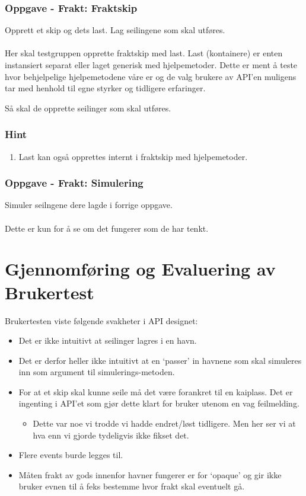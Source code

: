 \documentclass[12pt]{article}
\begin{document}
\newpage
\subsubsection{Oppgave - Frakt: Fraktskip}

Opprett et skip og dets last. Lag seilingene som skal utføres. \\ \\
Her skal testgruppen opprette fraktskip med last. Last (kontainere) er enten instansiert separat eller 
laget generisk med hjelpemetoder. Dette er ment å teste hvor behjelpelige hjelpemetodene våre er og 
de valg brukere av API'en muligens tar med henhold til egne styrker og tidligere erfaringer.

Så skal de opprette seilinger som skal utføres. 

\subsubsection*{Hint}

\begin{enumerate}
    \item Last kan også opprettes internt i fraktskip med hjelpemetoder.
\end{enumerate}

\subsubsection{Oppgave - Frakt: Simulering}

Simuler seilngene dere lagde i forrige oppgave. \\ \\
Dette er kun for å se om det fungerer som de har tenkt.

\section{Gjennomføring og Evaluering av Brukertest}

Brukertesten viste følgende svakheter i API designet:
\begin{itemize}
    \item Det er ikke intuitivt at seilinger lagres i en havn.
    \item Det er derfor heller ikke intuitivt at en `passer' in havnene som skal simuleres inn som argument til simulerings-metoden.
    \item For at et skip skal kunne seile må det være forankret til en kaiplass. Det er ingenting i API'et som gjør dette klart for bruker utenom en vag feilmelding.
    \begin{itemize}
        \item Dette var noe vi trodde vi hadde endret/løst tidligere. Men her ser vi at hva enn vi gjorde tydeligvis ikke fikset det.
    \end{itemize}
    \item Flere events burde legges til. 
    \item Måten frakt av gods innenfor havner fungerer er for `opaque' og gir ikke bruker evnen til å feks bestemme hvor frakt skal eventuelt gå.
\end{itemize}
\end{document}
